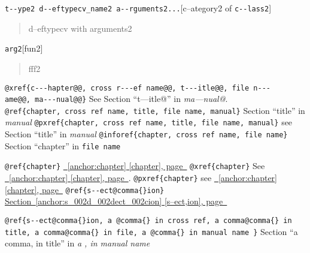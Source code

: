 \documentclass{book}
\begin{document}
\noindent\texttt{t{-}{-}ype2 d{-}{-}eftypecv\_name2 a{-}{-}rguments2...}\hfill[c--ategory2 of \texttt{c{-}{-}lass2}]

%
\begin{quote}
\unskip{\parskip=0pt\noindent}%
d--eftypecv with arguments2
\end{quote}

\noindent\texttt{arg2}\hfill[fun2]

%
\begin{quote}
\unskip{\parskip=0pt\noindent}%
fff2
\end{quote}


\texttt{@xref\{c{-}{-}{-}hapter@@,\ cross r{-}{-}{-}ef name@@,\ t{-}{-}{-}itle@@,\ file n{-}{-}{-}ame@@,\ ma{-}{-}{-}nual@@\}} See Section ``t---itle@'' in \textsl{ma---nual@}.
\texttt{@ref\{chapter,\ cross ref name,\ title,\ file name,\ manual\}} Section ``title'' in \textsl{manual}
\texttt{@pxref\{chapter,\ cross ref name,\ title,\ file name,\ manual\}} see Section ``title'' in \textsl{manual}
\texttt{@inforef\{chapter,\ cross ref name,\ file name\}} Section ``chapter'' in \texttt{file name}

\texttt{@ref\{chapter\}} \hyperref[anchor:chapter]{\chaptername~\ref*{anchor:chapter} [chapter], page~\pageref*{anchor:chapter}}
\texttt{@xref\{chapter\}} See \hyperref[anchor:chapter]{\chaptername~\ref*{anchor:chapter} [chapter], page~\pageref*{anchor:chapter}}.
\texttt{@pxref\{chapter\}} see \hyperref[anchor:chapter]{\chaptername~\ref*{anchor:chapter} [chapter], page~\pageref*{anchor:chapter}}
\texttt{@ref\{s{-}{-}ect@comma\{\}ion\}} \hyperref[anchor:s_002d_002dect_002cion]{Section~\ref*{anchor:s_002d_002dect_002cion} [s--ect,ion], page~\pageref*{anchor:s_002d_002dect_002cion}}

\texttt{@ref\{s{-}{-}ect@comma\{\}ion,\ a @comma\{\} in cross
ref,\ a comma@comma\{\} in title,\ a comma@comma\{\} in file,\ a @comma\{\} in manual name \}}
Section ``a comma, in title'' in \textsl{a , in manual name}
\end{document}
